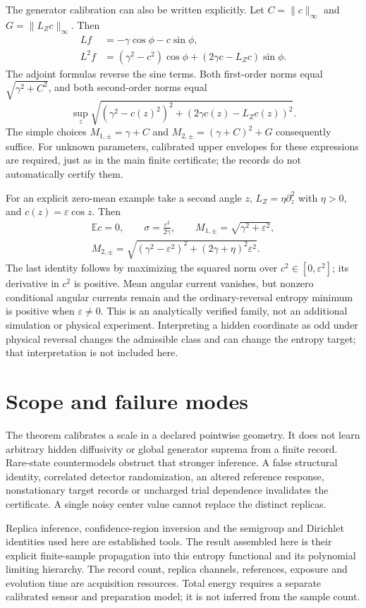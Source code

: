 The generator calibration can also be written explicitly.  Let
$C=\|c\|_\infty$ and $G=\|L_Zc\|_\infty$.  Then
\begin{align}
 Lf&=-\gamma\cos\phi-c\sin\phi,\\
 L^2f&=(\gamma^2-c^2)\cos\phi
                  +(2\gamma c-L_Zc)\sin\phi.
 \label{eq:dc-modulated-caps}
\end{align}
The adjoint formulas reverse the sine terms.  Both first-order norms equal
$\sqrt{\gamma^2+C^2}$, and both second-order norms equal
\[
 \sup_z\sqrt{(\gamma^2-c(z)^2)^2+
                       (2\gamma c(z)-L_Zc(z))^2}.
\]
The simple choices $M_{1,\pm}=\gamma+C$ and
$M_{2,\pm}=(\gamma+C)^2+G$ consequently suffice.  For unknown parameters,
calibrated upper envelopes for these expressions are required, just as in
the main finite certificate; the records do not automatically certify them.

For an explicit zero-mean example take a second angle $z$,
$L_Z=\eta\partial_z^2$ with $\eta>0$, and $c(z)=\varepsilon\cos z$.
Then
\begin{equation}
 \begin{gathered}
 \mathbb E c=0,\qquad
 \sigma=\frac{\varepsilon^2}{2\gamma},\qquad
 M_{1,\pm}=\sqrt{\gamma^2+\varepsilon^2},\\
 M_{2,\pm}=\sqrt{(\gamma^2-\varepsilon^2)^2
                            +(2\gamma+\eta)^2\varepsilon^2}.
 \end{gathered}
 \label{eq:dc-zero-mean-drive}
\end{equation}
The last identity follows by maximizing the squared norm over
$c^2\in[0,\varepsilon^2]$; its derivative in $c^2$ is positive.  Mean angular
current vanishes, but nonzero conditional angular currents remain and the
ordinary-reversal entropy minimum is positive when $\varepsilon\ne0$.
This is an analytically verified family, not an additional simulation or
physical experiment.  Interpreting a hidden coordinate as odd under
physical reversal changes the admissible class and can change the entropy
target; that interpretation is not included here.

\section{Scope and failure modes}

The theorem calibrates a scale in a declared pointwise geometry.  It does not
learn arbitrary hidden diffusivity or global generator suprema from a finite
record.  Rare-state countermodels obstruct that stronger inference.  A
false structural identity, correlated detector randomization, an altered
reference response, nonstationary target records or uncharged trial
dependence invalidates the certificate.  A single noisy center value cannot
replace the distinct replicas.

Replica inference, confidence-region inversion and the semigroup and
Dirichlet identities used here are established tools.  The result assembled
here is their explicit finite-sample propagation into this entropy
functional and its polynomial limiting hierarchy.  The record count,
replica channels, references, exposure and evolution time are acquisition
resources.  Total energy requires a separate calibrated sensor and preparation
model; it is not inferred from the sample count.
